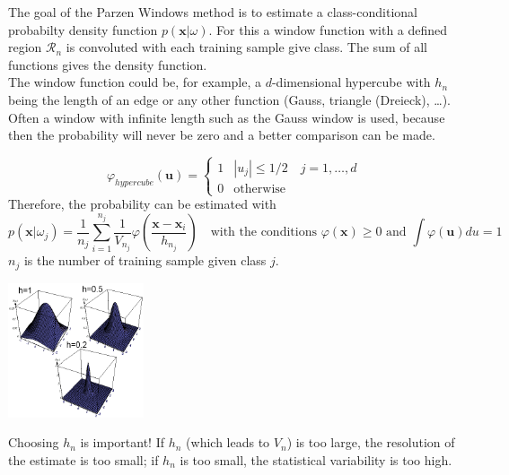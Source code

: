   	The goal of the Parzen Windows method is to estimate a class-conditional probabilty density function $p(\bm x | \omega)$. 
    For this a window function with a defined region $\mathcal{R}_n$ is convoluted with each training sample give class. 
    The sum of all functions gives the density function.\\
    The window function could be, for example, a $d$-dimensional hypercube with $h_n$ being the length of an edge or any other function 
    (Gauss, triangle (Dreieck), \ldots). 
    Often a window with infinite length such as the Gauss window is used, because then the probability will never be zero and a better comparison can be made.\\
    \begin{minipage}{13cm}
    	$$\varphi_{hypercube}(\bm{u}) = \begin{cases}
	    1 &|u_j| \leq 1/2 \quad  j=1,\ldots,d\\
	    0 & \text{otherwise}
	    \end{cases}$$
	    Therefore, the probability can be estimated with
	    $$p(\bm{x}|\omega_j) = \frac1{n_j} \sum_{i=1}^{n_j} \frac{1}{V_{n_j}} \varphi \left(\frac{\bm{x}-\bm{x}_i}{h_{n_j}} \right) \quad 
	    \text{with the conditions } \varphi(\bm{x}) \geq 0 \text{ and } \int \varphi(\bm{u}) du = 1 $$
	    $n_j$ is the number of training sample given class $j$. \\
    \end{minipage}
    \begin{minipage}{5cm}
        \includegraphics[width=4cm]{./images/parzenWindow.png}
    \end{minipage}
    
    Choosing $h_n$ is important! If $h_n$ (which leads to $V_n$) is too large, the resolution of the
    estimate is too small; if $h_n$ is too small, the statistical variability is too high.
    
